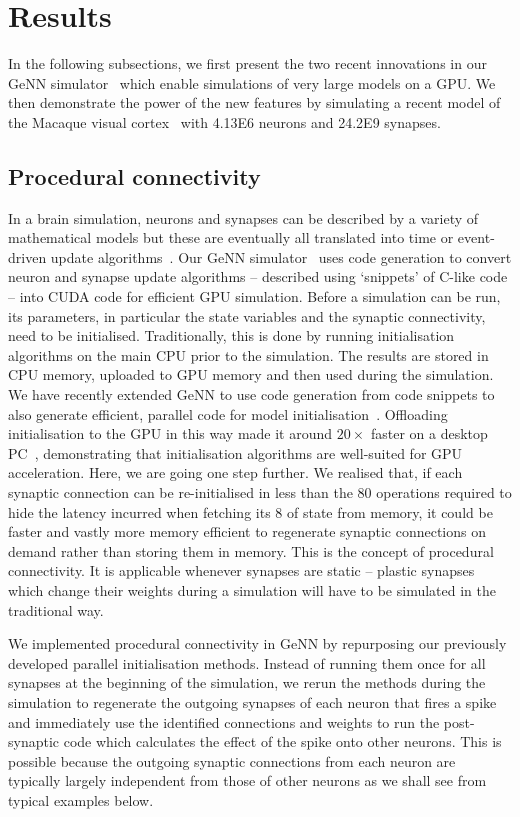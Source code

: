 \documentclass[9pt,a4paper]{amsart}
\begin{document}
\section{Results}
In the following subsections, we first present the two recent innovations in our GeNN simulator~\citep{Yavuz2016} which enable simulations of very large models on a GPU.
We then demonstrate the power of the new features by simulating a recent model of the Macaque visual cortex~\citep{Schmidt2018} with \num{4.13E6} neurons and \num{24.2E9} synapses.

\subsection{Procedural connectivity}
\label{sec:results/procedural}
In a brain simulation, neurons and synapses can be described by a variety of mathematical models but these are eventually all translated into time or event-driven update algorithms~\citep{Brette2007}.
Our GeNN simulator~\citep{Yavuz2016} uses code generation to convert neuron and synapse update algorithms -- described using `snippets' of C-like code -- into CUDA code for efficient GPU simulation.
Before a simulation can be run, its parameters, in particular the state variables and the synaptic connectivity, need to be initialised.
Traditionally, this is done by running initialisation algorithms on the main CPU prior to the simulation.
The results are stored in CPU memory, uploaded to GPU memory and then used during the simulation.
We have recently extended GeNN to use code generation from code snippets to also generate efficient, parallel code for model initialisation~\citep{Knight2018}.
Offloading initialisation to the GPU in this way made it around $20\times$ faster on a desktop PC~\citep{Knight2018}, demonstrating that initialisation algorithms are well-suited for GPU acceleration.
Here, we are going one step further.
We realised that, if each synaptic connection can be re-initialised in less than the 80 operations required to hide the latency incurred when fetching its \SI{8}{\byte} of state from memory, it could be faster and vastly more memory efficient to regenerate synaptic connections on demand rather than storing them in memory.
This is the concept of procedural connectivity.
It is applicable whenever synapses are static -- plastic synapses which change their weights during a simulation will have to be simulated in the traditional way.

We implemented procedural connectivity in GeNN by repurposing our previously developed parallel initialisation methods.
Instead of running them once for all synapses at the beginning of the simulation, we rerun the methods during the simulation to regenerate the outgoing synapses of each neuron that fires a spike and immediately use the identified connections and weights to run the post-synaptic code which calculates the effect of the spike onto other neurons.
This is possible because the outgoing synaptic connections from each neuron are typically largely independent from those of other neurons as we shall see from typical examples below.
\end{document}
